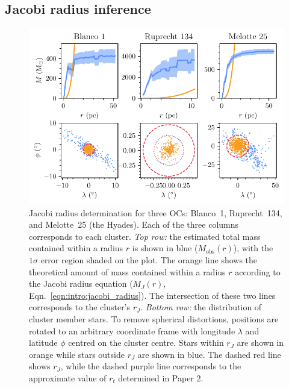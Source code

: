 \subsection{Jacobi radius inference}
\label{sec:dynamics:masses:jacobi}

\begin{figure}[t]
    \centering
    \includegraphics[width=\textwidth]{fig/c4/masses_jacobi_radii.pdf}
    \caption[Jacobi radius determination for three OCs: Blanco~1, Ruprecht~134, and Melotte~25]{Jacobi radius determination for three OCs: Blanco~1, Ruprecht~134, and Melotte~25 (the Hyades). Each of the three columns corresponds to each cluster. \emph{Top row:} the estimated total mass contained within a radius $r$ is shown in blue ($M_\text{obs}(r)$), with the $1\sigma$ error region shaded on the plot. The orange line shows the theoretical amount of mass contained within a radius $r$ according to the Jacobi radius equation ($M_J(r)$, Eqn.~\ref{eqn:intro:jacobi_radius}). The intersection of these two lines corresponds to the cluster's $r_J$. \emph{Bottom row:} the distribution of cluster member stars. To remove spherical distortions, positions are rotated to an arbitrary coordinate frame with longitude $\lambda$ and latitude $\phi$ centred on the cluster centre. Stars within $r_J$ are shown in orange while stars outside $r_J$ are shown in blue. The dashed red line shows $r_J$, while the dashed purple line corresponds to the approximate value of $r_t$ determined in Paper 2.}
    \label{fig:dynamics:masses:radii_examples}
\end{figure}

